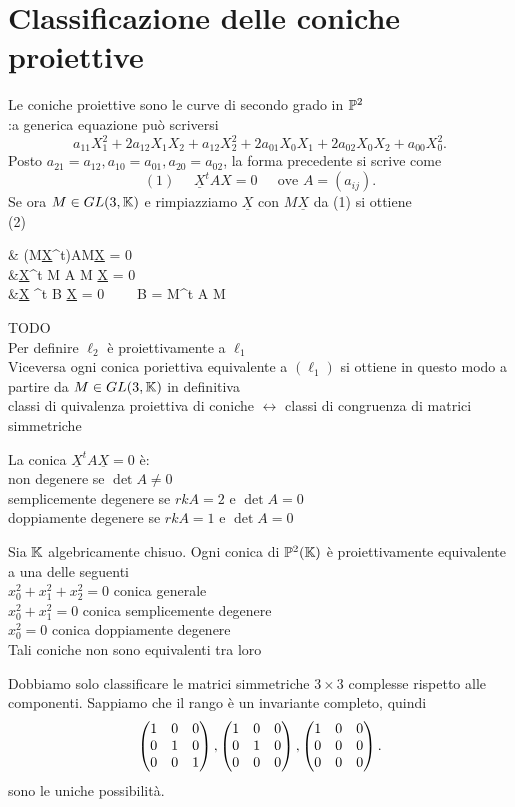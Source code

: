 \documentclass[12px]{article}
\begin{document}
	\section{Classificazione delle coniche proiettive}
	Le coniche proiettive sono le curve di secondo grado in $\mathbb{P}^2$\\
	:a generica equazione può scriversi 
	 \[
		 a_{11}X_1^2+2a_{12}X_1X_2+a_{12}X_2^2+2a_{01}X_0X_1+2a_{02}X_0X_2+a_{00}X_0^2
	.\] 
	Posto $a_{21}=a_{12}, a_{10}=a_{01},a_{20}=a_{02}$, la forma precedente si scrive come 
	\[
		(1)\ \ \ \ \ \ 	\underline X^t A X = 0 \ \ \ \ \ \text{ ove } A = (a_{ij})
	.\] 
	Se ora $M\in GL(3,\mathbb{K})$ e rimpiazziamo $\underline X$ con $M\underline X$ da (1) si ottiene \\
	(2)\begin{aligend}
	&	(M\underline X^t)AM\underline X = 0\\
	&\underline X^t M A M \underline X =  0\\
	&\underline X ^t B \underline X = 0 \ \ \ \ B = M^t A M
	\end{aligend} TODO \\
	Per definire $\ell_2$ è proiettivamente a $\ell_1$ \\
	Viceversa ogni conica poriettiva equivalente a $(\ell_1)$ si ottiene in questo modo a partire da $M\in GL(3,\mathbb{K})$ in definitiva\\
	classi di quivalenza proiettiva di coniche $\leftrightarrow $ classi di congruenza di matrici simmetriche 
	\begin{defi}
		La conica  $\underline X^tA\underline X = 0$ è:\\
		non degenere se  $\det A \neq 0$\\
		semplicemente degenere se  $rk A = 2$ e $\det A =0$\\
		doppiamente degenere se  $rk A  = 1$ e $\det A = 0$
	\end{defi}
	\begin{teo}
		Sia $\mathbb{K}$ algebricamente chisuo. Ogni conica di $\mathbb{P}^2(\mathbb{K})$ è proiettivamente equivalente a una delle seguenti\\
		$x_0^2+x_1^2+x_2^2 =0$ conica generale\\
		$x_0^2 +x_1^2 = 0$ conica semplicemente degenere\\
		$x_0^2=0$ conica doppiamente degenere\\
		Tali coniche non sono equivalenti tra loro
	\end{teo}
	\begin{dimo}
		Dobbiamo solo classificare le matrici simmetriche $3\times 3$ complesse rispetto alle componenti. Sappiamo che il rango è un invariante completo, quindi
		\[
			\begin{pmatrix}1&0&0\\0&1&0\\0&0&1\end{pmatrix},\begin{pmatrix}1&0&0\\0&1&0\\0&0&0\end{pmatrix},\begin{pmatrix}1&0&0\\0&0&0\\0&0&0\end{pmatrix}
		.\] 
		sono le uniche possibilità.\\
	\end{dimo}
\end{document}
